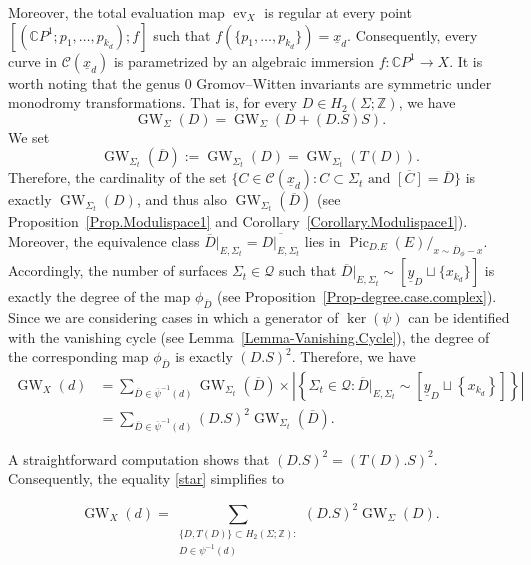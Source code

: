 \documentclass[10pt,a4paper]{article}
\numberwithin{equation}{section}
\theoremstyle{definition}
\theoremstyle{plain}
\theoremstyle{remark}
\newcommand{\Z}{\mathbb{Z}}
\newcommand{\C}{\mathbb{C}}
\DeclareMathOperator{\GW}{GW}
\DeclareMathOperator{\Pic}{Pic}
\DeclareMathOperator{\ev}{ev}
\begin{document}
 Moreover, the total evaluation map  $\ev_{X}$ is regular at every point $[(\C P^1;p_1,\ldots,p_{k_d});f]$ such that $f(\{p_1,\ldots,p_{k_d}\})=\underline{x}_d$. Consequently, every curve in $\mathcal{C}({\underline{x}_d})$  is parametrized by an algebraic immersion $f\colon \mathbb{C}P^1\to X$. It is worth noting that the genus $0$ Gromov--Witten invariants are symmetric under mono\-dromy transformations. That is, for every $D\in H_2(\Sigma;\Z)$, we have
  $$\GW_{\Sigma}(D)=\GW_{\Sigma}(D+(D.S)S).$$
 We set
 $$\GW_{\Sigma_t}(\overline{D}):= \GW_{\Sigma_t}(D)=\GW_{\Sigma_t}(T(D)).$$
 Therefore, the cardinality of the set  $\{C\in \mathcal{C}(\underline{x}_d): C \subset \Sigma_t \text{ and } \overline{[C]}=\overline{D} \}$  is exactly $\GW_{\Sigma_t}({D})$, and thus also $\GW_{\Sigma_t}(\overline{D})$  (see Proposition~\ref{Prop.Modulispace1} and Corollary~\ref{Corollary.Modulispace1}).  Moreover, the equivalence class $\overline{D}|_{E,\Sigma_t}=\overline{D|_{E,\Sigma_t}}$ lies in $\Pic_{D.E} (E)/_{x\sim \overline{D}_{\phi}-x}$. Accordingly, the number of surfaces $\Sigma_t\in\mathcal{Q}$ such that $\overline{D}|_{E,\Sigma_t}\sim [\underline{y}_D\sqcup \{x_{k_d}\}]$ is exactly the degree of  the map  $\phi_{\overline{D}}$ (see  Proposition~\ref{Prop-degree.case.complex}). Since we are considering cases in which a generator of $\ker (\psi)$ can be identified with the vanishing cycle (see Lemma~\ref{Lemma-Vanishing.Cycle}), the degree of the corresponding map  $\phi_{\overline{D}}$ is exactly $(D.S)^2$. Therefore, we have 
\begin{equation}\tag{$\star$}\label{star}
     \begin{aligned}
        \GW_X(d) &=\sum_{\overline{D}\in \overline{\psi}^{-1}(d)} \GW_{\Sigma_t}\left(\overline{D}\right) \times  \left|\left\{\Sigma_t\in\mathcal{Q}: \overline{D}|_{E,\Sigma_t}\sim \left[\underline{y}_D\sqcup \left\{x_{k_d}\right\}\right]\right\}\right| \\
       &=\sum_{\overline{D}\in \overline{\psi}^{-1}(d)}  (D.S)^2 \GW_{\Sigma_t}\left(\overline{D}\right).
    \end{aligned}
\end{equation}
   

 
    
A straightforward computation shows that $(D.S)^2=(T(D).S)^2$. Consequently, the equality \eqref{star} simplifies to
 
$$ 
    \GW_X(d)=\sum_{\substack{\{D,T(D)\}\subset H_2(\Sigma;\Z):\\D\in \psi^{-1}(d)}
      }(D.S)^2 \GW_{\Sigma}(D).$$
      
\end{document}
